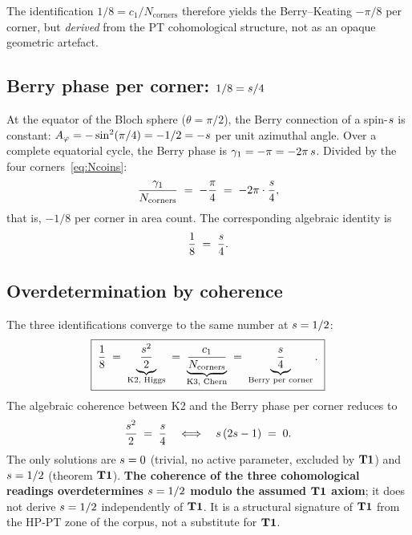 The identification $1/8 = c_1/N_{\mathrm{corners}}$ therefore yields
the Berry--Keating $-\pi/8$ per corner, but \emph{derived} from the
PT cohomological structure, not as an opaque geometric artefact.

\subsection{Berry phase per corner: $1/8 = s/4$}
\label{sec:phase_berry}

At the equator of the Bloch sphere ($\theta = \pi/2$), the Berry
connection of a spin-$s$ is constant:
$A_\varphi = -\sin^{2}(\pi/4) = -1/2 = -s$ per unit azimuthal
angle. Over a complete equatorial cycle, the Berry phase is
$\gamma_1 = -\pi = -2\pi\,s$. Divided by the four
corners~\eqref{eq:Ncoins}:
\begin{equation}
\dfrac{\gamma_1}{N_{\mathrm{corners}}} \;=\; -\dfrac{\pi}{4} \;=\; -2\pi \cdot \dfrac{s}{4},
\label{eq:s_sur_4}
\end{equation}
that is, $-1/8$ per corner in area count. The corresponding algebraic
identity is
\begin{equation}
\dfrac{1}{8} \;=\; \dfrac{s}{4}.
\label{eq:un_huitieme_sur_4}
\end{equation}

\subsection{Overdetermination by coherence}
\label{sec:surdetermination_coherence}

The three identifications converge to the same number at $s = 1/2$:
\begin{equation}
\boxed{\;
\dfrac{1}{8} \;=\; \underbrace{\dfrac{s^{2}}{2}}_{\text{K2, Higgs}} \;=\; \underbrace{\dfrac{c_1}{N_{\mathrm{corners}}}}_{\text{K3, Chern}} \;=\; \underbrace{\dfrac{s}{4}}_{\text{Berry per corner}}.\;}
\label{eq:triple_identification}
\end{equation}
The algebraic coherence between K2 and the Berry phase per corner
reduces to
\begin{equation}
\dfrac{s^{2}}{2} \;=\; \dfrac{s}{4} \quad\Longleftrightarrow\quad s\,(2s - 1) \;=\; 0.
\label{eq:coherence_K2_Berry}
\end{equation}
The only solutions are $s = 0$ (trivial, no active parameter,
excluded by $\textbf{T1}$) and $s = 1/2$ (theorem $\textbf{T1}$). \textbf{The
coherence of the three cohomological readings overdetermines
$s = 1/2$ modulo the assumed $\textbf{T1}$ axiom}; it does not derive
$s = 1/2$ independently of $\textbf{T1}$. It is a structural signature
of $\textbf{T1}$ from the HP-PT zone of the corpus, not a substitute for
$\textbf{T1}$.

